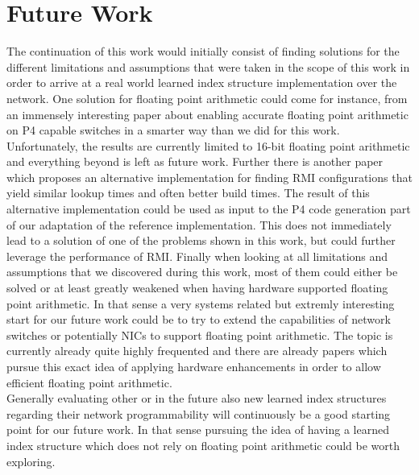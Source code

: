 \pagebreak

\section{Future Work}
The continuation of this work would initially consist of finding solutions for the different limitations and assumptions that were taken in the scope of this work in order to arrive at a real world learned index structure implementation over the network. One solution for floating point arithmetic could come for instance, from an immensely interesting paper \cite{netfc} about enabling accurate floating point arithmetic on P4 capable switches in a smarter way than we did for this work. Unfortunately, the results are currently limited to 16-bit floating point arithmetic and everything beyond is left as future work. Further there is another paper \cite{maltry2021critical} which proposes an alternative implementation for finding RMI configurations that yield similar lookup times and often better build times. The result of this alternative implementation could be used as input to the P4 code generation part of our adaptation of the reference implementation. This does not immediately lead to a solution of one of the problems shown in this work, but could further leverage the performance of RMI. Finally when looking at all limitations and assumptions that we discovered during this work, most of them could either be solved or at least greatly weakened when having hardware supported floating point arithmetic. In that sense a very systems related but extremly interesting start for our future work could be to try to extend the capabilities of network switches or potentially NICs to support floating point arithmetic. The topic is currently already quite highly frequented and there are already papers \cite{inline-fpa} which pursue this exact idea of applying hardware enhancements in order to allow efficient floating point arithmetic.\\

Generally evaluating other or in the future also new learned index structures regarding their network programmability will continuously be a good starting point for our future work. In that sense pursuing the idea of having a learned index structure which does not rely on floating point arithmetic could be worth exploring.

